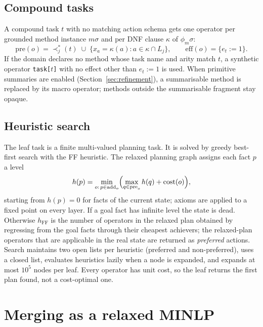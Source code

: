 \documentclass[11pt,a4paper]{article}
\newcommand{\pre}{\mathrm{pre}}
\newcommand{\add}{\mathrm{add}}
\begin{document}
\subsection{Compound tasks}
A compound task $t$ with no matching action schema gets one operator per
grounded method instance $m\sigma$ and per DNF clause $\kappa$ of
$\phi_m\sigma$:
\begin{equation}
\pre(o)=\prec_j^*(t)\;\cup\;
\bigl\{x_a=\kappa(a):a\in\kappa\cap L_j\bigr\},
\qquad
\mathrm{eff}(o)=\{e_t:=1\}.
\label{eq:leaf-method}
\end{equation}
If the domain declares no method whose task name and arity match $t$, a
synthetic operator \texttt{task[$t$]} with no effect other than $e_t:=1$ is
used. When primitive summaries are enabled
(Section~\ref{sec:refinement}), a summarisable method is replaced by its macro
operator; methods outside the summarisable fragment stay opaque.

\subsection{Heuristic search}
The leaf task is a finite multi-valued planning task. It is solved by greedy
best-first search with the FF heuristic. The relaxed planning graph assigns
each fact $p$ a level
\begin{equation}
h(p)=\min_{o:\,p\in\add_o}\Bigl(\max_{q\in\pre_o}h(q)+\mathrm{cost}(o)\Bigr),
\end{equation}
starting from $h(p)=0$ for facts of the current state; axioms are applied to a
fixed point on every layer. If a goal fact has infinite level the state is
dead. Otherwise $h_{\mathrm{FF}}$ is the number of operators in the relaxed
plan obtained by regressing from the goal facts through their cheapest
achievers; the relaxed-plan operators that are applicable in the real state
are returned as \emph{preferred} actions. Search maintains two open lists per
heuristic (preferred and non-preferred), uses a closed list, evaluates
heuristics lazily when a node is expanded, and expands at most
$10^5$ nodes per leaf. Every operator has unit cost, so the leaf returns the
first plan found, not a cost-optimal one.

\section{Merging as a relaxed MINLP}
\label{sec:merge}
\end{document}
